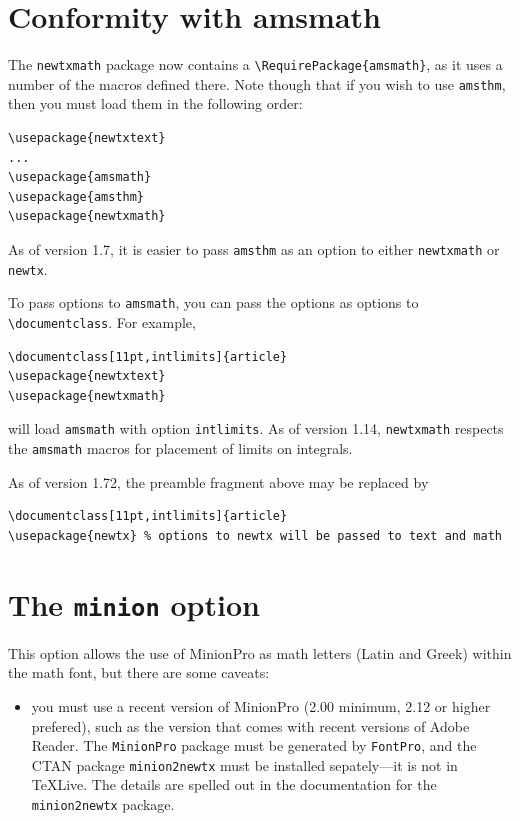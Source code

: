 \documentclass[\fsc]{article}
\theoremstyle{oldplain}
\theoremstyle{plain}
\begin{document}
\section{Conformity with amsmath}
The {\tt newtxmath} package now contains a \verb|\RequirePackage{amsmath}|, as it uses a number of the macros defined there. Note though that if you wish to use {\tt amsthm}, then you must load them in the following order:
\begin{verbatim}
\usepackage{newtxtext}
...
\usepackage{amsmath} 
\usepackage{amsthm}
\usepackage{newtxmath}
\end{verbatim}
As of version 1.7, it is easier to pass {\tt amsthm} as an option to either {\tt newtxmath} or {\tt newtx}.

To pass options to {\tt amsmath}, you can pass the options as options to \verb|\documentclass|. For example,
\begin{verbatim}
\documentclass[11pt,intlimits]{article}
\usepackage{newtxtext}
\usepackage{newtxmath}
\end{verbatim}
will load {\tt amsmath} with option {\tt intlimits}. As of version 1.14, {\tt newtxmath} respects the {\tt amsmath} macros for placement of limits on integrals.

As of version 1.72, the preamble fragment above may be replaced by

\begin{verbatim}
\documentclass[11pt,intlimits]{article}
\usepackage{newtx} % options to newtx will be passed to text and math
\end{verbatim}


\section{The {\tt minion} option}
This option allows the use of MinionPro as math letters (Latin and Greek) within  the math font, but there are some caveats:
\begin{itemize}
\item
you must use a recent version of MinionPro (2.00 minimum, 2.12 or higher prefered), such as the version that comes with recent versions of Adobe Reader. The {\tt MinionPro} package must be generated by {\tt FontPro}, and the CTAN package {\tt minion2newtx} must be installed sepately---it is not in \TeX Live. The details are spelled out in the documentation for the {\tt minion2newtx} package.
\end{itemize}
\end{document}
